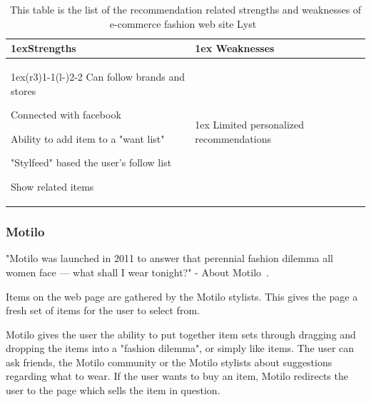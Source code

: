     \begin{table}[H]
    	\centering
        \begin{tabularx}{\linewidth}{>{\parskip1ex}X@{\kern4\tabcolsep}>{\parskip1ex}X}
        \toprule
        	\hfil\bfseries Strengths
            &
            \hfil\bfseries Weaknesses
            \\\cmidrule(r{3\tabcolsep}){1-1}\cmidrule(l{-\tabcolsep}){2-2}
                    Can follow brands and stores \par
                    Connected with facebook \par
                    Ability to add item to a "want list" \par
                    "Stylfeed" based the user's follow list \par
                    Show related items \par
                    &
                    Limited personalized recommendations \par
                    \\\bottomrule
                \end{tabularx}
        \caption[Recommendation related strengths and weaknesses of Lyst~\cite{lyst}]{This table is the list of the recommendation related strengths and weaknesses of e-commerce fashion web site Lyst~\cite{lyst}}
        \label{table:ecommenreceLyst}
    \end{table}

\subsubsection{Motilo} %
\label{par:motilo}
    "Motilo was launched in 2011 to answer that perennial fashion dilemma all women face --- what shall I wear tonight?" - About Motilo~\cite{motilo}.

    Items on the web page are gathered by the Motilo stylists.
    This gives the page a fresh set of items for the user to select from.

    Motilo gives the user the ability to put together item sets through dragging and dropping the items into a "fashion dilemma", or simply like items.
    The user can ask friends, the Motilo community or the Motilo stylists about suggestions regarding what to wear.
    If the user wants to buy an item, Motilo redirects the user to the page which sells the item in question.

